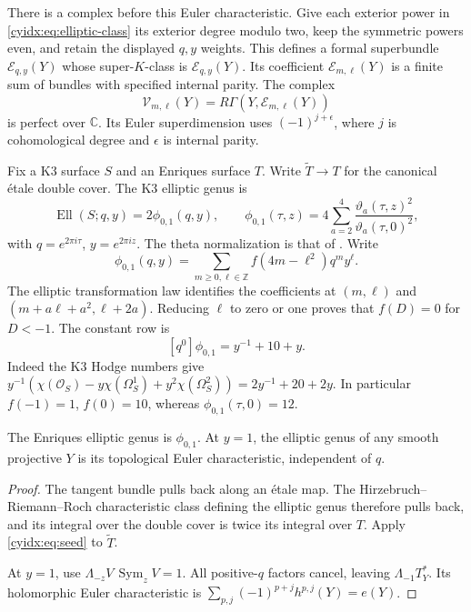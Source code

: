 There is a complex before this Euler characteristic. Give each
exterior power in \eqref{cyidx:eq:elliptic-class} its exterior
degree modulo two, keep the symmetric powers even, and retain
the displayed \(q,y\) weights. This defines a formal superbundle
\(\mathscr E_{q,y}(Y)\) whose super-\(K\)-class is
\(\mathcal E_{q,y}(Y)\). Its coefficient \(\mathscr E_{m,\ell}(Y)\)
is a finite sum of bundles with specified internal parity.
The complex
\begin{equation}\label{cyidx:eq:coefficients}
 \mathscr V_{m,\ell}(Y)=
 R\Gamma(Y,\mathscr E_{m,\ell}(Y))
\end{equation}
is perfect over \(\mathbb C\). Its Euler superdimension uses
\((-1)^{j+\epsilon}\), where \(j\) is cohomological degree and
\(\epsilon\) is internal parity.

Fix a K3 surface \(S\) and an Enriques surface \(T\).
Write \(\widetilde T\to T\) for the canonical étale double
cover. The K3 elliptic genus is
\begin{equation}\label{cyidx:eq:seed}
 \operatorname{Ell}(S;q,y)=2\phi_{0,1}(q,y),\qquad
 \phi_{0,1}(\tau,z)=
 4\sum_{a=2}^4\frac{\vartheta_a(\tau,z)^2}
                         {\vartheta_a(\tau,0)^2},
\end{equation}
with \(q=e^{2\pi i\tau}\), \(y=e^{2\pi iz}\).
The theta normalization is that of \cite{EZ}.
Write
\[
 \phi_{0,1}(q,y)=\sum_{m\geq0,\ell\in\mathbb Z}
                      f(4m-\ell^2)q^my^\ell.
\]
The elliptic transformation law identifies the coefficients
at \((m,\ell)\) and \((m+a\ell+a^2,\ell+2a)\).
Reducing \(\ell\) to zero or one proves that \(f(D)=0\)
for \(D<-1\). The constant row is
\[
 [q^0]\phi_{0,1}=y^{-1}+10+y.
\]
Indeed the K3 Hodge numbers give
\(y^{-1}(\chi(\mathcal O_S)-y\chi(\Omega_S^1)
+y^2\chi(\Omega_S^2))=2y^{-1}+20+2y\).
In particular \(f(-1)=1\), \(f(0)=10\), whereas
\(\phi_{0,1}(\tau,0)=12\).

\begin{proposition}\label{cyidx:prop:half-index}
The Enriques elliptic genus is \(\phi_{0,1}\).
At \(y=1\), the elliptic genus of any smooth projective
\(Y\) is its topological Euler characteristic, independent
of \(q\).
\end{proposition}
\begin{proof}
The tangent bundle pulls back along an étale map. The
Hirzebruch--Riemann--Roch characteristic class defining
the elliptic genus therefore pulls back, and its integral
over the double cover is twice its integral over \(T\).
Apply \eqref{cyidx:eq:seed} to \(\widetilde T\).

At \(y=1\), use
\(\Lambda_{-z}V\,\operatorname{Sym}_zV=1\).
All positive-\(q\) factors cancel, leaving
\(\Lambda_{-1}T_Y^*\). Its holomorphic Euler characteristic
is \(\sum_{p,j}(-1)^{p+j}h^{p,j}(Y)=e(Y)\).
\end{proof}

